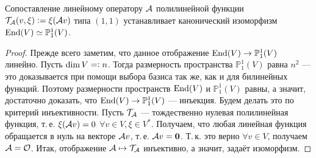 \begin{proposal}
    Сопоставление линейному оператору $\mathcal{A}$ полилинейной функции $\mathcal{T}_{\mathcal{A}}(v, \xi) \vcentcolon = \xi(\mathcal{A} v)$ типа $(1, 1)$ устанавливает канонический изоморфизм $\operatorname{End}(V) \simeq \mathbb{P}_1^1(V)$.
\end{proposal}

\begin{proof}
    Прежде всего заметим, что данное отображение $\operatorname{End}(V) \to \mathbb{P}_1^1(V)$ линейно. Пусть $\dim V = \vcentcolon n$. Тогда размерность пространства $\mathbb{P}_1^1(V)$ равна $n^2$ --- это доказывается при помощи выбора базиса так же, как и для билинейных функций. Поэтому размерности пространств $\operatorname{End}(V)$ и $\mathbb{P}_1^1(V)$ равны, а значит, достаточно доказать, что $\operatorname{End}(V) \to \mathbb{P}_1^1(V)$ --- инъекция. Будем делать это по критерий инъективности. Пусть $\mathcal{T}_{\mathcal{A}}$ --- тождественно нулевая полилинейная функция, т.\,е. $\xi(\mathcal{A} v) = 0$ $\forall v \in V, \xi \in V^\ast$. Получаем, что любая линейная функция обращается в нуль на векторе $\mathcal{A} v$, т.\,е. $\mathcal{A} v = \boldsymbol{0}$. Т.\,к. это верно $\forall v \in V$, получаем $\mathcal{A} = \mathcal{O}$. Итак, отображение $\mathcal{A} \mapsto \mathcal{T}_{\mathcal{A}}$ инъективно, а значит, задаёт изоморфизм.
\end{proof}

